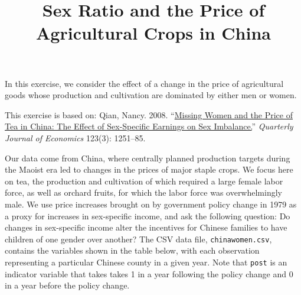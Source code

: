 \documentclass[]{article}
\title{Sex Ratio and the Price of Agricultural Crops in China}
\author{}
\date{}
\begin{document}
\maketitle


In this exercise, we consider the effect of a change in the price of
agricultural goods whose production and cultivation are dominated by
either men or women.

This exercise is based on: Qian, Nancy. 2008.
``\href{http://dx.doi.org/10.1162/qjec.2008.123.3.1251}{Missing Women
and the Price of Tea in China: The Effect of Sex-Specific Earnings on
Sex Imbalance.}'' \emph{Quarterly Journal of Economics} 123(3):
1251--85.

Our data come from China, where centrally planned production targets
during the Maoist era led to changes in the prices of major staple
crops. We focus here on tea, the production and cultivation of which
required a large female labor force, as well as orchard fruits, for
which the labor force was overwhelmingly male. We use price increases
brought on by government policy change in 1979 as a proxy for increases
in sex-specific income, and ask the following question: Do changes in
sex-specific income alter the incentives for Chinese families to have
children of one gender over another? The CSV data file,
\texttt{chinawomen.csv}, contains the variables shown in the table
below, with each observation representing a particular Chinese county in
a given year. Note that \texttt{post} is an indicator variable that
takes takes 1 in a year following the policy change and 0 in a year
before the policy change.
\end{document}
